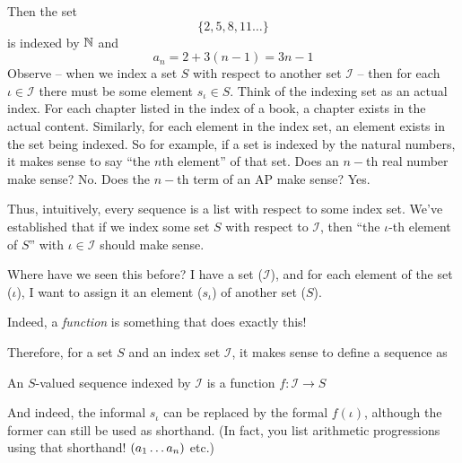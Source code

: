 Then the set
$$
\{2, 5, 8, 11 \dots\}
$$
is indexed by $\mathbb{N}$ and
$$a_n = 2 + 3(n - 1) = 3n -1$$
Observe -- when we index a set $S$ with respect to another set $\mathcal I$ -- then for each $\iota \in \mathcal I$ there must be some element $s_\iota \in S$. Think of the indexing set as an actual index. For each chapter listed in the index of a book, a chapter exists in the actual content. Similarly, for each element in the index set, an element exists in the set being indexed. So for example, if a set is indexed by the natural numbers, it makes sense to say ``the $n$th element'' of that set. Does an $n-$th real number make sense? No. Does the $n-$th term of an AP make sense? Yes.

Thus, intuitively, every sequence is a list with respect to some index set. We've established that if we index some set $S$ with respect to $\mathcal I$, then ``the $\iota$-th element of $S$'' with $\iota \in \mathcal I$ should make sense.

Where have we seen this before? I have a set ($\mathcal I$), and for each element of the set ($\iota$), I want to assign it an element ($s_\iota$) of another set ($S$).

Indeed, a \emph{function} is something that does exactly this!

Therefore, for a set $S$ and an index set $\mathcal I$, it makes sense to define a sequence as
\begin{SNP}{\dfn
}{An $S$-valued sequence indexed by $\mathcal I$ is a function $f: \mathcal I \rightarrow S$
}
\end{SNP}

And indeed, the informal $s_\iota$ can be replaced by the formal $f(\iota)$, although the former can still be used as shorthand. (In fact, you list arithmetic progressions using that shorthand! $({a}_1 \dots {a}_{n})$ etc.)
